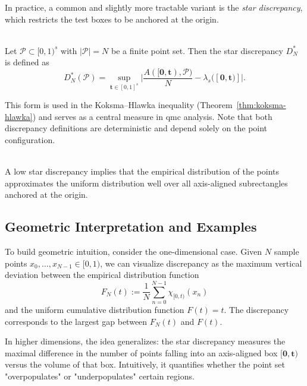 In practice, a common and slightly more tractable variant is the \emph{star
discrepancy}, which restricts the test boxes to be anchored at the origin.

\begin{definition} \ \\
Let $\mathcal{P}\subset [0,1)^s$ with $|\mathcal{P}| = N$ be a finite point set.
Then the star discrepancy $D_N^*$ is defined as
\begin{equation*}
    D_N^*(\mathcal{P}) = \sup\limits_{\boldsymbol{t} \in [0,1]^s} \bigg| \frac{A([\boldsymbol{0},\boldsymbol{t}), \mathcal{P})}{N} - \lambda_s([\boldsymbol{0},\boldsymbol{t})] \bigg|.
\end{equation*}
\end{definition}

This form is used in the Koksma--Hlawka inequality
(Theorem~\ref{thm:koksma-hlawka}) and serves as a central measure in \ac{qmc}
analysis. Note that both discrepancy definitions are deterministic and depend
solely on the point configuration.

\begin{remark} \ \\
A low star discrepancy implies that the empirical distribution of the points
approximates the uniform distribution well over all axis-aligned subrectangles
anchored at the origin.
\end{remark}

\subsection{Geometric Interpretation and Examples}

To build geometric intuition, consider the one-dimensional case. Given $N$ sample
points $x_0, \dots, x_{N-1} \in [0,1)$, we can visualize discrepancy as the
maximum vertical deviation between the empirical distribution function
\begin{equation*}
F_N(t) := \frac{1}{N} \sum_{n=0}^{N-1} \chi_{[0,t)}(x_n)
\end{equation*}
and the uniform cumulative distribution function $F(t) = t$. The discrepancy
corresponds to the largest gap between $F_N(t)$ and $F(t)$.

In higher dimensions, the idea generalizes: the star discrepancy measures the
maximal difference in the number of points falling into an axis-aligned box
$[\boldsymbol{0}, \boldsymbol{t})$ versus the volume of that box. Intuitively,
it quantifies whether the point set "overpopulates" or "underpopulates" certain
regions.

